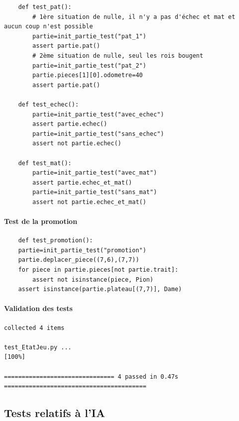 \documentclass{article}
\begin{document}
\begin{verbatim}
    def test_pat():
        # 1ère situation de nulle, il n'y a pas d'échec et mat et aucun coup n'est possible
        partie=init_partie_test("pat_1")
        assert partie.pat()
        # 2ème situation de nulle, seul les rois bougent
        partie=init_partie_test("pat_2")
        partie.pieces[1][0].odometre=40
        assert partie.pat()
        
    def test_echec():
        partie=init_partie_test("avec_echec")
        assert partie.echec()
        partie=init_partie_test("sans_echec")
        assert not partie.echec()
    
    def test_mat():
        partie=init_partie_test("avec_mat")
        assert partie.echec_et_mat()
        partie=init_partie_test("sans_mat")
        assert not partie.echec_et_mat()
\end{verbatim}

\paragraph{Test de la promotion}
\begin{verbatim}
    def test_promotion():
    partie=init_partie_test("promotion")
    partie.deplacer_piece((7,6),(7,7))
    for piece in partie.pieces[not partie.trait]:
        assert not isinstance(piece, Pion)
    assert isinstance(partie.plateau[(7,7)], Dame)
\end{verbatim}

\paragraph{Validation des tests}
\begin{verbatim}
collected 4 items

test_EtatJeu.py ...                                                                                                                                                  [100%]

=============================== 4 passed in 0.47s ======================================== 
\end{verbatim}

\subsection{Tests relatifs à l'IA}
\end{document}
